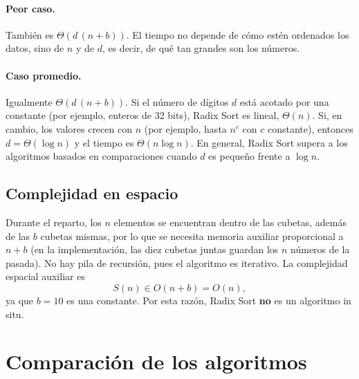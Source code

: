 \paragraph{Peor caso.} También es $\Theta(d\,(n + b))$. El tiempo no depende de cómo estén ordenados los datos, sino de $n$ y de $d$, es decir, de qué tan grandes son los números.

\paragraph{Caso promedio.} Igualmente $\Theta(d\,(n + b))$. Si el número de dígitos $d$ está acotado por una constante (por ejemplo, enteros de 32 bits), Radix Sort es lineal, $\Theta(n)$. Si, en cambio, los valores crecen con $n$ (por ejemplo, hasta $n^c$ con $c$ constante), entonces $d = \Theta(\log n)$ y el tiempo es $\Theta(n \log n)$. En general, Radix Sort supera a los algoritmos basados en comparaciones cuando $d$ es pequeño frente a $\log n$.

\subsection{Complejidad en espacio}

Durante el reparto, los $n$ elementos se encuentran dentro de las cubetas, además de las $b$ cubetas mismas, por lo que se necesita memoria auxiliar proporcional a $n + b$ (en la implementación, las diez cubetas juntas guardan los $n$ números de la pasada). No hay pila de recursión, pues el algoritmo es iterativo. La complejidad espacial auxiliar es
\[
  S(n) \in O(n + b) = O(n),
\]
ya que $b = 10$ es una constante. Por esta razón, Radix Sort \textbf{no} es un algoritmo in situ.

\section{Comparación de los algoritmos}

